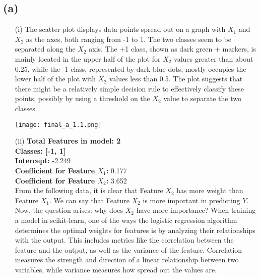 \documentclass{article}
\begin{document}
\subsection*{(a)}
\begin{enumerate}
    \item[(i)]   
The scatter plot displays data points spread out on a graph with $X_1$ and $X_2$ as the axes, both ranging from -1 to 1. The two classes seem to be separated along the $X_2$ axis. The +1 class, shown as dark green + markers, is mainly located in the upper half of the plot for $X_2$ values greater than about 0.25, while the -1 class, represented by dark blue dots, mostly occupies the lower half of the plot with $X_2$ values less than 0.5. The plot suggests that there might be a relatively simple decision rule to effectively classify these points, possibly by using a threshold on the $X_2$ value to separate the two classes.\\
    \begin{center}
        \centering
        \texttt{[image: final\_a\_1.1.png]}
        \centering \\
        \label{fig:enter-label}
    \end{center}

    \newpage
    \item[(ii)] \textbf{Total Features in model: 2} \\
\textbf{Classes: [-1, 1]} \\
\textbf{Intercept:} -2.249 \\
\textbf{Coefficient for Feature $X_1$:} 0.177 \\
\textbf{Coefficient for Feature $X_2$:} 3.652 \\

From the following data, it is clear that Feature $X_2$ has more weight than Feature $X_1$. We can say that Feature $X_2$ is more important in predicting $Y$. Now, the question arises: why does $X_2$ have more importance? When training a model in scikit-learn, one of the ways the logistic regression algorithm determines the optimal weights for features is by analyzing their relationships with the output. This includes metrics like the correlation between the feature and the output, as well as the variance of the feature. Correlation measures the strength and direction of a linear relationship between two variables, while variance measures how spread out the values are. \\


\end{enumerate}
\end{document}
